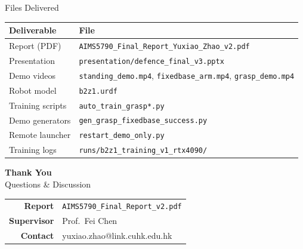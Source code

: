 \documentclass[10pt,aspectratio=169]{beamer}
\begin{document}
\begin{frame}{Files Delivered}
  \small
  \begin{table}
    \centering
    \begin{tabular}{l p{8.5cm}}
      \toprule
      \textbf{Deliverable} & \textbf{File} \\
      \midrule
      Report (PDF)       & \texttt{AIMS5790\_Final\_Report\_Yuxiao\_Zhao\_v2.pdf} \\
      Presentation       & \texttt{presentation/defence\_final\_v3.pptx} \\
      Demo videos        & \texttt{standing\_demo.mp4}, \texttt{fixedbase\_arm.mp4},
                           \texttt{grasp\_demo.mp4} \\
      Robot model        & \texttt{b2z1.urdf} \\
      Training scripts   & \texttt{auto\_train\_grasp*.py} \\
      Demo generators    & \texttt{gen\_grasp\_fixedbase\_success.py} \\
      Remote launcher    & \texttt{restart\_demo\_only.py} \\
      Training logs      & \texttt{runs/b2z1\_training\_v1\_rtx4090/} \\
      \bottomrule
    \end{tabular}
  \end{table}
\end{frame}

\begin{frame}[plain]
  \centering
  \vspace{1.8cm}
  {\Huge\color{cuhkpurple}\bfseries Thank You}\\[12pt]
  {\Large Questions \& Discussion}\\[24pt]

  \begin{tabular}{rl}
    \textbf{Report}      & \texttt{AIMS5790\_Final\_Report\_v2.pdf} \\[3pt]
    \textbf{Supervisor}  & Prof.\ Fei Chen \\[3pt]
    \textbf{Contact}     & yuxiao.zhao@link.cuhk.edu.hk \\
  \end{tabular}
\end{frame}
\end{document}
